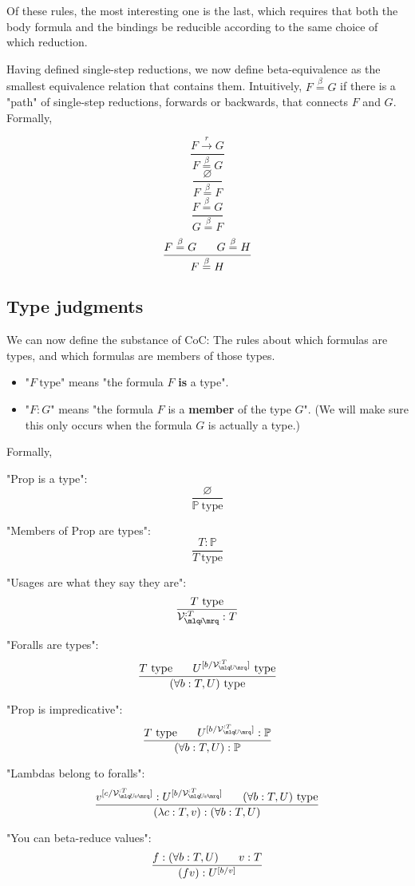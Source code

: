 \documentclass{article}
\newcommand{\Prop}{\mathbb{P}}
\newcommand{\istype}{\ \mathrm{type}}
\newcommand{\usage}{\mathcal{V}}
\newcommand{\usageKnown}[2]{{\usage_{\mlq\hspace{-0.06em}#2\hspace{-0.06em}\mrq}^{:#1}}}
\newcommand{\presep}{\hspace{1.8em}}
\newcommand{\subst}[3]{#1^{[{#2}{/}{#3}]}}
\newcommand{\betaeq}{\overset{\beta}{=}}
\newcommand{\betared}[1]{\overset{#1}{\rightarrow}}
\begin{document}
Of these rules, the most interesting one is the last, which requires that both the body formula and the bindings be reducible according to the same choice of which reduction.

Having defined single-step reductions, we now define beta-equivalence as the smallest equivalence relation that contains them. Intuitively, $F \betaeq G$ if there is a "path" of single-step reductions, forwards or backwards, that connects $F$ and $G$. Formally,

\[ \frac{F \betared{r} G}{F \betaeq G} \]
\[ \frac{\varnothing}{F \betaeq F} \]
\[ \frac{F \betaeq G}{G \betaeq F} \]
\[ \frac{F \betaeq G \presep G \betaeq H}{F \betaeq H} \]
  
  
  \subsection{Type judgments}
  
  We can now define the substance of CoC: The rules about which formulas are types, and which formulas are members of those types.
  
  \begin{itemize}
  \item "$F\istype$" means "the formula $F$ \textbf{is} a type".
  \item "$F : G$" means "the formula $F$ is a \textbf{member} of the type $G$". (We will make sure this only occurs when the formula $G$ is actually a type.)
  \end{itemize}
  
  Formally,
  
  "Prop is a type":
  \[ \frac{\varnothing}{\Prop\istype} \]  
  
  "Members of Prop are types":
  \[ \frac{T : \Prop}{T\istype} \]
  
  "Usages are what they say they are":
  \[ \frac{T\istype}{\usageKnown{T}{i}:T} \]
  
  "Foralls are types":
  \[ \frac{T\istype\presep \subst{U}{b}{\usageKnown{T}{U}}\istype}{(\forall b:T,U)\istype} \]
  
  "Prop is impredicative":
  \[ \frac{T\istype\presep \subst{U}{b}{\usageKnown{T}{U}} : \Prop}{(\forall b:T,U) : \Prop} \]
  
  "Lambdas belong to foralls":
  \[ \frac{\subst{v}{c}{\usageKnown{T}{U\!v}} : \subst{U}{b}{\usageKnown{T}{U\!v}} \presep (\forall b:T,U)\istype}{(\lambda c:T,v) : (\forall b:T,U)} \]
  
  "You can beta-reduce values":
  \[ \frac{f : (\forall b:T,U) \presep v : T}{(f v) : \subst{U}{b}{v}} \]
  
\end{document}
